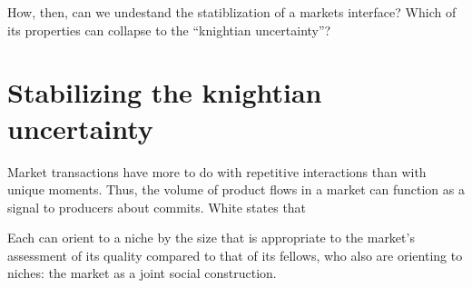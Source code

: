 \documentclass[a4paper, 12pt, openright, oneside, german, french, brazil, english]{abntex2}
\begin{document}
	
	
	
	How, then, can we undestand the statiblization of a markets interface? Which of its properties can collapse to the ``knightian uncertainty''?
	


	\section{Stabilizing the knightian uncertainty}
	
	
	Market transactions have more to do with repetitive interactions than with unique moments. Thus, the volume of product flows in a market can function as a signal to producers about commits. White states that
	
	\begin{citacao}
		Each can orient to a niche by the size that is appropriate to the market's assessment of its quality compared to that of its fellows, who also are orienting to niches: the market as a joint social construction. \cite[p. 10]{white2002markets}
	\end{citacao}
	
\end{document}
